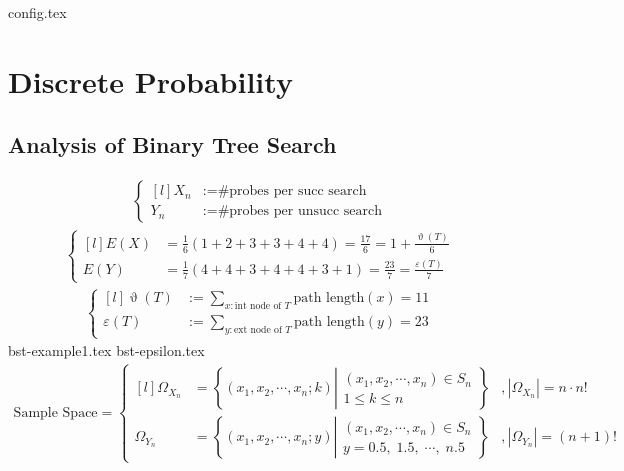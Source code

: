 \documentclass[12pt,a4paper,oneside]{report}
\begin{document}
{config.tex}

\fi

\setcounter{chapter}{7}
\chapter{Discrete Probability}


\section{Analysis of Binary Tree Search}

\begin{align*}
	\left\{\begin{matrix*}[l]
		X_n &:= \text{\# probes per succ search} \\
		Y_n &:= \text{\# probes per unsucc search}
	\end{matrix*}\right.
\end{align*}
\begin{align*}
	\left\{\begin{matrix*}[l]
		E(X) &= \frac{1}{6} \left(1+2+3+3+4+4\right) = \frac{17}{6} = 1 + \frac{\upvartheta(T)}{6} \\
		E(Y) &= \frac{1}{7} \left(4+4+3+4+4+3+1\right) = \frac{23}{7} = \frac{\varepsilon(T)}{7}
	\end{matrix*}\right.
\end{align*}
\begin{align*}
	\left\{\begin{matrix*}[l]
		\upvartheta(T) &:= \sum_{x : \text{int node of } T} \text{path length}(x) = 11\\
		\varepsilon(T) &:= \sum_{y : \text{ext node of } T} \text{path length}(y) = 23
	\end{matrix*}\right.
\end{align*}
{bst-example1.tex}
{bst-epsilon.tex}
\begin{align*}
	\text{Sample Space} = \left\{\begin{matrix*}[l]
		\Omega_{X_n} &= \left\{(x_1, x_2, \cdots, x_n; k) 
			\left|\begin{matrix}
				(x_1, x_2, \cdots, x_n) \in S_n \\ 
				1 \le k \le n
			\end{matrix}\right. 
		\right\} &, |\Omega_{X_n}| = n \cdot n! \\
		\Omega_{Y_n} &= \left\{(x_1, x_2, \cdots, x_n; y)
	   		\left|\begin{matrix}	
				(x_1, x_2, \cdots, x_n) \in S_n \\
				y = 0.5, \; 1.5, \; \cdots, \; n.5
			\end{matrix}\right.
		\right\} &, |\Omega_{Y_n}| = (n+1)!
	\end{matrix*}\right. 
\end{align*}
\end{document}
